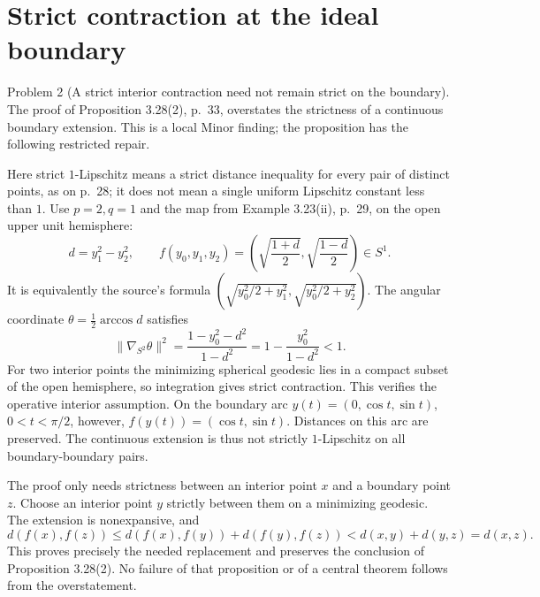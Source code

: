 \documentclass[10pt]{article}
\begin{document}
\section*{Strict contraction at the ideal boundary}
Problem 2 (A strict interior contraction need not remain strict on the boundary).  The proof of Proposition 3.28(2), p. 33, overstates the strictness of a continuous boundary extension. This is a local Minor finding; the proposition has the following restricted repair.\par
Here strict \(1\)-Lipschitz means a strict distance inequality for every pair of distinct points, as on p. 28; it does not mean a single uniform Lipschitz constant less than \(1\). Use \(p=2,q=1\) and the map from Example 3.23(ii), p. 29, on the open upper unit hemisphere: \[d=y_1^2-y_2^2,\qquad
 f(y_0,y_1,y_2)=
 \left(\sqrt{\frac{1+d}{2}},\sqrt{\frac{1-d}{2}}\right)\in S^1.\] It is equivalently the source’s formula \((\sqrt{y_0^2/2+y_1^2},\sqrt{y_0^2/2+y_2^2})\). The angular coordinate \(\theta=\tfrac12\arccos d\) satisfies \[\|\nabla_{S^2}\theta\|^2
   =\frac{1-y_0^2-d^2}{1-d^2}
   =1-\frac{y_0^2}{1-d^2}<1 .\] For two interior points the minimizing spherical geodesic lies in a compact subset of the open hemisphere, so integration gives strict contraction. This verifies the operative interior assumption. On the boundary arc \(y(t)=(0,\cos t,\sin t)\), \(0<t<\pi/2\), however, \(f(y(t))=(\cos t,\sin t)\). Distances on this arc are preserved. The continuous extension is thus not strictly \(1\)-Lipschitz on all boundary-boundary pairs.\par
The proof only needs strictness between an interior point \(x\) and a boundary point \(z\). Choose an interior point \(y\) strictly between them on a minimizing geodesic. The extension is nonexpansive, and \[d(f(x),f(z))
 \leq d(f(x),f(y))+d(f(y),f(z))
 <d(x,y)+d(y,z)=d(x,z).\] This proves precisely the needed replacement and preserves the conclusion of Proposition 3.28(2). No failure of that proposition or of a central theorem follows from the overstatement.\par
\end{document}
